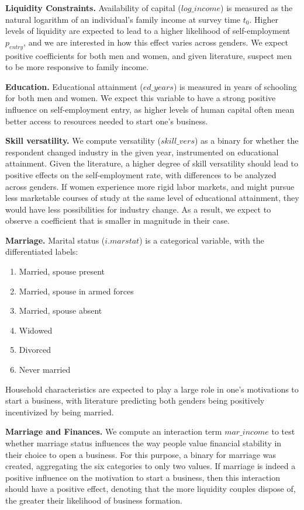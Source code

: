 \textbf{Liquidity Constraints.} Availability of capital ($log\_income$) is measured as the natural logarithm of an individual's family income at survey time $t_0$. Higher levels of liquidity are expected to lead to a higher likelihood of self-employment $p_{entry}$, and we are interested in how this effect varies across genders. We expect positive coefficients for both men and women, and given literature, suspect men to be more responsive to family income. 

\textbf{Education.} Educational attainment ($ed\_years$) is measured in years of schooling for both men and women. We expect this variable to have a strong positive influence on self-employment entry, as higher levels of human capital often mean better access to resources needed to start one's business. 

\textbf{Skill versatility.} We compute versatility ($skill\_vers$) as a binary for whether the respondent changed industry in the given year, instrumented on educational attainment. Given the literature, a higher degree of skill versatility should lead to positive effects on the self-employment rate, with differences to be analyzed across genders. If women experience more rigid labor markets, and might pursue less marketable courses of study at the same level of educational attainment, they would have less possibilities for industry change. As a result, we expect to observe a coefficient that is smaller in magnitude in their case. 

\textbf{Marriage.}  Marital status ($i.marstat$) is a categorical variable, with the differentiated labels:
\begin{enumerate}
\singlespacing
\item Married, spouse present
\item Married, spouse in armed forces
\item Married, spouse absent
\item Widowed
\item Divorced
\item Never married
\end{enumerate}

Household characteristics are expected to play a large role in one's motivations to start a business, with literature predicting both genders being positively incentivized by being married. 

\textbf{Marriage and Finances.} We compute an interaction term $mar\_income$ to test whether marriage status influences the way people value financial stability in their choice to open a business. For this purpose, a binary for marriage was created, aggregating the six categories to only two values. If marriage is indeed a positive influence on the motivation to start a business, then this interaction should have a positive effect, denoting that the more liquidity couples dispose of, the greater their likelihood of business formation. 

